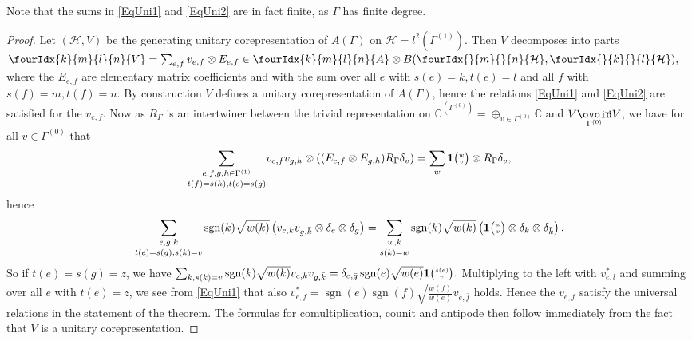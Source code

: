 \documentclass[10pt]{article}
\DeclareMathOperator{\sgn}{\mathrm{sgn}}
\newcommand{\Circtv}[1]{\underset{#1}{\mathop{\ooalign{$\ovoid$\cr\hidewidth\raise-.05ex\hbox{$\scriptstyle\mathsf T\mkern3.5mu$}\cr}}}} %
\newcommand{\C}{\mathbb{C}}
\newcommand{\Hsp}{\mathcal{H}}
\newcommand{\Grt}[3]{#1{\tiny {\begin{pmatrix} #2\\#3\end{pmatrix}}}}
\newcommand{\UnitC}[2]{\Grt{\mathbf{1}}{#1}{#2}}
\newcommand{\Gr}[5]{\fourIdx{#2}{#4}{#3}{#5}{#1}}%
\newcommand{\Gru}[3]{\Gr{#1}{}{}{#2}{#3}}
\theoremstyle{definition}
\numberwithin{equation}{section}
\begin{document}
Note that the sums in \eqref{EqUni1} and \eqref{EqUni2} are in fact finite, as $\Gamma$ has finite degree. 

\begin{proof} Let $(\Hsp,V)$ be the generating unitary corepresentation of $A(\Gamma)$ on $\Hsp = l^2(\Gamma^{(1)})$. Then $V$ decomposes into parts $\Gr{V}{k}{l}{m}{n} = \sum_{e,f} v_{e,f} \otimes E_{e,f} \in \Gr{A}{k}{l}{m}{n}\otimes B(\Gru{\Hsp}{m}{n},\Gru{\Hsp}{k}{l}),$ where the $E_{e,f}$ are elementary matrix coefficients and with the sum over all $e$ with $s(e)=k,t(e)=l$ and all $f$ with $s(f) = m, t(f)=n$. By construction $V$ defines a unitary corepresentation of $A(\Gamma)$, hence the relations \eqref{EqUni1} and \eqref{EqUni2} are satisfied for the $v_{e,f}$. Now as $R_{\Gamma}$ is an intertwiner between the trivial representation on $\C^{(\Gamma^{(0)})} = \oplus_{v\in \Gamma^{(0)}} \C$ and $V\Circtv{\Gamma^{(0)}} V$, we have for all $v\in \Gamma^{(0)}$ that \begin{equation}\label{EqMorR}\underset{t(f)=s(h),t(e)=s(g)}{\sum_{e,f,g,h\in \Gamma^{(1)}}} v_{e,f}v_{g,h}\otimes \left((E_{e,f}\otimes E_{g,h}) R_{\Gamma} \delta_v\right) = \sum_w \UnitC{w}{v}\otimes R_{\Gamma}\delta_v,\end{equation} hence
\[\underset{t(e)=s(g),s(k)=v}{\sum_{e,g,k}} \sgn(k)\sqrt{w(k)}\left( v_{e,k}v_{g,\bar{k}} \otimes \delta_e\otimes \delta_{g}\right) =\underset{s(k)=w}{\sum_{w,k}}\sgn(k)\sqrt{w(k)} \left(\UnitC{w}{v} \otimes \delta_k\otimes \delta_{\bar{k}}\right).\] So if $t(e) = s(g)=z$, we have $\sum_{k,s(k)=v} \sgn(k)\sqrt{w(k)} v_{e,k}v_{g,\bar{k}} =  \delta_{e,\bar{g}} \sgn(e)\sqrt{w(e)}\UnitC{s(e)}{v}.$ Multiplying to the left with $v_{e,l}^*$ and summing over all $e$ with $t(e) = z$, we see from \eqref{EqUni1} that also $v_{e,f}^* = \sgn(e)\sgn(f)\sqrt{\frac{w(f)}{w(e)}} v_{\bar{e},\bar{f}}$ holds. Hence the $v_{e,f}$ satisfy the universal relations in the statement of the theorem. The formulas for comultiplication, counit and antipode then follow immediately from the fact that $V$ is a unitary corepresentation.


\end{proof}
\end{document}
